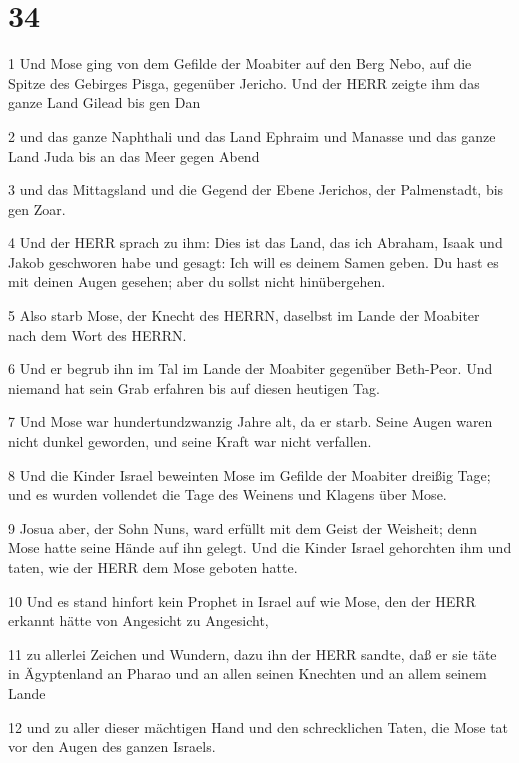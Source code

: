 \chapter{34}

\par 1 Und Mose ging von dem Gefilde der Moabiter auf den Berg Nebo, auf die Spitze des Gebirges Pisga, gegenüber Jericho. Und der HERR zeigte ihm das ganze Land Gilead bis gen Dan
\par 2 und das ganze Naphthali und das Land Ephraim und Manasse und das ganze Land Juda bis an das Meer gegen Abend
\par 3 und das Mittagsland und die Gegend der Ebene Jerichos, der Palmenstadt, bis gen Zoar.
\par 4 Und der HERR sprach zu ihm: Dies ist das Land, das ich Abraham, Isaak und Jakob geschworen habe und gesagt: Ich will es deinem Samen geben. Du hast es mit deinen Augen gesehen; aber du sollst nicht hinübergehen.
\par 5 Also starb Mose, der Knecht des HERRN, daselbst im Lande der Moabiter nach dem Wort des HERRN.
\par 6 Und er begrub ihn im Tal im Lande der Moabiter gegenüber Beth-Peor. Und niemand hat sein Grab erfahren bis auf diesen heutigen Tag.
\par 7 Und Mose war hundertundzwanzig Jahre alt, da er starb. Seine Augen waren nicht dunkel geworden, und seine Kraft war nicht verfallen.
\par 8 Und die Kinder Israel beweinten Mose im Gefilde der Moabiter dreißig Tage; und es wurden vollendet die Tage des Weinens und Klagens über Mose.
\par 9 Josua aber, der Sohn Nuns, ward erfüllt mit dem Geist der Weisheit; denn Mose hatte seine Hände auf ihn gelegt. Und die Kinder Israel gehorchten ihm und taten, wie der HERR dem Mose geboten hatte.
\par 10 Und es stand hinfort kein Prophet in Israel auf wie Mose, den der HERR erkannt hätte von Angesicht zu Angesicht,
\par 11 zu allerlei Zeichen und Wundern, dazu ihn der HERR sandte, daß er sie täte in Ägyptenland an Pharao und an allen seinen Knechten und an allem seinem Lande
\par 12 und zu aller dieser mächtigen Hand und den schrecklichen Taten, die Mose tat vor den Augen des ganzen Israels.


